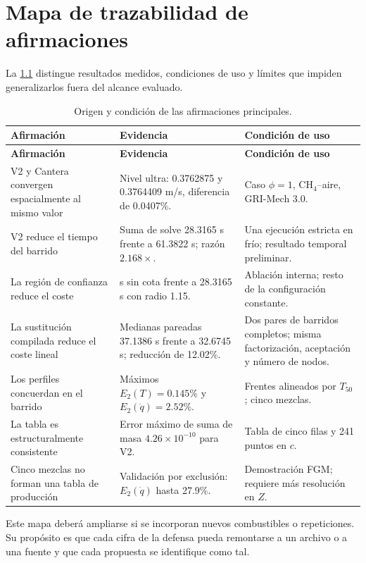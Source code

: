 \documentclass[12pt,a4paper,twoside,openany]{book}
\begin{document}
\chapter{Mapa de trazabilidad de afirmaciones}
\label{app:traceability}

La \cref{tab:claim-traceability} distingue resultados medidos, condiciones de
uso y límites que impiden generalizarlos fuera del alcance evaluado.

\begin{longtable}{@{}>{\raggedright\arraybackslash}p{}
>{\raggedright\arraybackslash}p{}
>{\raggedright\arraybackslash}p{}@{}}
\caption{Origen y condición de las afirmaciones principales.}
\label{tab:claim-traceability}\\
\toprule
\textbf{Afirmación} & \textbf{Evidencia} & \textbf{Condición de uso} \\
\midrule
\endfirsthead
\toprule
\textbf{Afirmación} & \textbf{Evidencia} & \textbf{Condición de uso} \\
\midrule
\endhead
V2 y Cantera convergen espacialmente al mismo valor & Nivel ultra: 0.3762875 y
0.3764409 m/s, diferencia de 0.0407\%. & Caso \(\phi=1\), CH\(_4\)--aire,
GRI-Mech 3.0. \\
V2 reduce el tiempo del barrido & Suma de solve 28.3165 s frente a 61.3822 s;
razón \(2.168\times\). & Una ejecución estricta en frío; resultado temporal
preliminar. \\
La región de confianza reduce el coste & 153.8411 s sin cota frente a 28.3165 s
con radio 1.15. & Ablación interna; resto de la configuración constante. \\
La sustitución compilada reduce el coste lineal & Medianas pareadas 37.1386 s
frente a 32.6745 s; reducción de 12.02\%. & Dos pares de barridos completos;
misma factorización, aceptación y número de nodos. \\
Los perfiles concuerdan en el barrido & Máximos \(E_2(T)=0.145\%\) y
\(E_2(\dot q)=2.52\%\). & Frentes alineados por \(T_{50}\); cinco mezclas. \\
La tabla es estructuralmente consistente & Error máximo de suma de masa
\(4.26\times10^{-10}\) para V2. & Tabla de cinco filas y 241 puntos en \(c\). \\
Cinco mezclas no forman una tabla de producción & Validación por exclusión:
\(E_2(\dot q)\) hasta 27.9\%. & Demostración FGM; requiere más resolución en
\(Z\). \\
\bottomrule
\end{longtable}

Este mapa deberá ampliarse si se incorporan nuevos combustibles o repeticiones.
Su propósito es que cada cifra de la defensa pueda remontarse a un archivo o a
una fuente y que cada propuesta se identifique como tal.

\cleardoublepage
{}
{}


\end{document}
